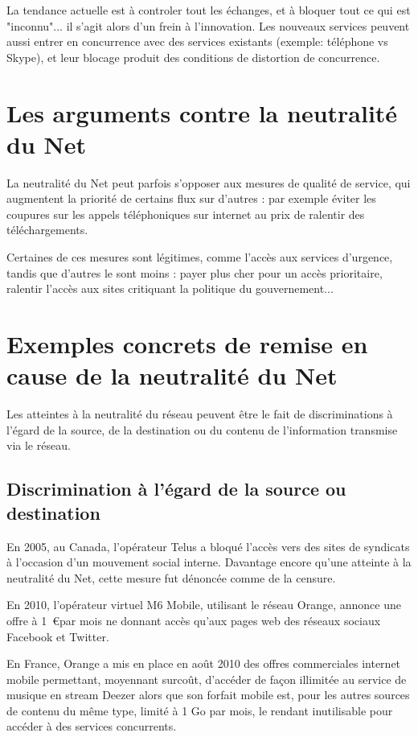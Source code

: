 \documentclass[12pt]{../fiche}
\begin{document}
La tendance actuelle est à controler tout les échanges, et à bloquer tout
ce qui est "inconnu"... il s'agit alors d'un frein à l'innovation.
Les nouveaux services peuvent aussi entrer en concurrence avec des
services existants (exemple: téléphone vs Skype), et leur blocage produit
des conditions de distortion de concurrence.

\section{Les arguments contre la neutralité du Net}

La neutralité du Net peut parfois s'opposer aux mesures de \og{}qualité
de service\fg{}, qui augmentent la priorité de certains flux sur d'autres :
par exemple éviter les coupures sur les appels téléphoniques sur internet
au prix de ralentir des téléchargements.

Certaines de ces mesures sont légitimes, comme l'accès aux services d'urgence,
tandis que d'autres le sont moins : payer plus cher pour un accès prioritaire,
ralentir l'accès aux sites critiquant la politique du gouvernement...

\section{Exemples concrets de remise en cause de la neutralité du Net}

Les atteintes à la neutralité du réseau peuvent être le fait de
discriminations à l'égard de la source, de la destination ou du contenu
de l'information transmise via le réseau.

\subsection{Discrimination à l'égard de la
source ou destination}

En 2005, au Canada, l'opérateur Telus a bloqué l'accès vers des sites de
syndicats à l'occasion d'un mouvement social interne. Davantage encore
qu'une atteinte à la neutralité du Net, cette mesure fut dénoncée comme
de la censure.

En 2010, l'opérateur virtuel M6 Mobile, utilisant le réseau Orange,
annonce une offre à 1~\euro par mois ne donnant accès qu'aux pages web
des réseaux sociaux Facebook et Twitter.

En France, Orange a mis en place en août 2010 des offres commerciales
internet mobile permettant, moyennant surcoût, d'accéder de façon
illimitée au service de musique en stream Deezer alors que son forfait
mobile est, pour les autres sources de contenu du même type, limité à 1
Go par mois, le rendant inutilisable pour accéder à des services
concurrents.
\end{document}
